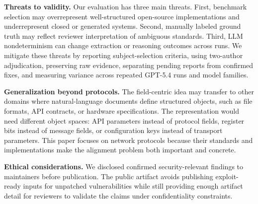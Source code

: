 
\textbf{Threats to validity.}
Our evaluation has three main threats. First, benchmark selection may
overrepresent well-structured open-source implementations and underrepresent
closed or generated systems. Second, manually labeled ground truth may reflect
reviewer interpretation of ambiguous standards. Third, LLM nondeterminism can
change extraction or reasoning outcomes across runs. We mitigate these threats
by reporting subject-selection criteria, using two-author adjudication,
preserving raw evidence, separating pending reports from confirmed fixes, and
measuring variance across repeated GPT-5.4 runs and model families.


\textbf{Generalization beyond protocols.}
The field-centric idea may transfer to other domains where natural-language
documents define structured objects, such as file formats, API contracts, or
hardware specifications. The representation would need different object spaces:
API parameters instead of protocol fields, register bits instead of message
fields, or configuration keys instead of transport parameters. This paper
focuses on network protocols because their standards and implementations make
the alignment problem both important and concrete.

\textbf{Ethical considerations.}
We disclosed confirmed security-relevant findings to maintainers before
publication. The public artifact avoids publishing exploit-ready inputs for
unpatched vulnerabilities while still providing enough artifact detail for
reviewers to validate the claims under confidentiality constraints.
